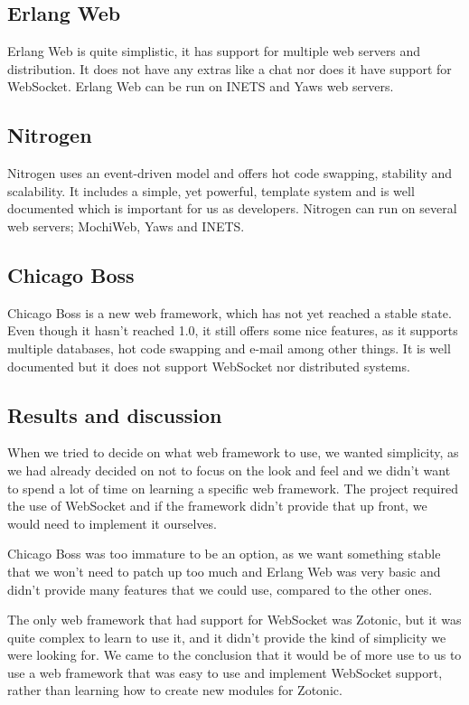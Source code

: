 \documentclass[11pt,a4paper]{report}
\begin{document}
\subsection{Erlang Web}
Erlang Web\cite{erlangweb} is quite simplistic, it has support for multiple web
servers and distribution. It does not have any extras like a chat nor does it
have support for WebSocket. Erlang Web can be run on INETS and Yaws web
servers.

\subsection{Nitrogen}
Nitrogen\cite{nitrogen} uses an event-driven model and offers hot code swapping,
stability and scalability. It includes a simple, yet powerful, template system
and is well documented which is important for us as developers. Nitrogen can run
on several web servers; MochiWeb, Yaws and INETS.

\subsection{Chicago Boss}
Chicago Boss\cite{chicagoboss} is a new web framework, which has not yet reached
a stable state. Even though it hasn't reached 1.0, it still offers some nice
features, as it supports multiple databases, hot code swapping and e-mail among
other things. It is well documented but it does not support WebSocket nor
distributed systems.

\subsection{Results and discussion}
When we tried to decide on what web framework to use, we wanted simplicity, as
we had already decided on not to focus on the look and feel and we didn't want
to spend a lot of time on learning a specific web framework.
The project required the use of WebSocket and if the framework didn't
provide that up front, we would need to implement it ourselves.

Chicago Boss was too immature to be an option, as we want something stable that
we won't need to patch up too much and Erlang Web was very basic and didn't
provide many features that we could use, compared to the other ones.

The only web framework that had support for WebSocket was Zotonic, but it was
quite complex to learn to use it, and it didn't provide the kind of simplicity
we were looking for. We came to the conclusion that it would be of more use to
us to use a web framework that was easy to use and implement WebSocket support,
rather than learning how to create new modules for Zotonic.
\end{document}
